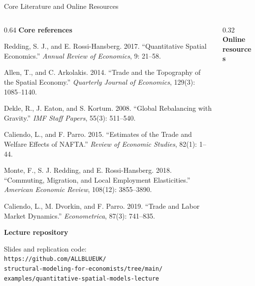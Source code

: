 \documentclass[aspectratio=169,11pt]{beamer}
\begin{document}
\begin{frame}[t]{Core Literature and Online Resources}
  \fontsize{7.4}{8.7}\selectfont
  \begin{columns}[T,onlytextwidth]
    \begin{column}{0.64\textwidth}
      {\color{deepred}\bfseries Core references}

      \vspace{2pt}
      Redding, S. J., and E. Rossi-Hansberg. 2017.
      ``Quantitative Spatial Economics.''
      \emph{Annual Review of Economics}, 9: 21--58.

      \vspace{3pt}
      Allen, T., and C. Arkolakis. 2014.
      ``Trade and the Topography of the Spatial Economy.''
      \emph{Quarterly Journal of Economics}, 129(3): 1085--1140.

      \vspace{3pt}
      Dekle, R., J. Eaton, and S. Kortum. 2008.
      ``Global Rebalancing with Gravity.''
      \emph{IMF Staff Papers}, 55(3): 511--540.

      \vspace{3pt}
      Caliendo, L., and F. Parro. 2015.
      ``Estimates of the Trade and Welfare Effects of NAFTA.''
      \emph{Review of Economic Studies}, 82(1): 1--44.

      \vspace{3pt}
      Monte, F., S. J. Redding, and E. Rossi-Hansberg. 2018.
      ``Commuting, Migration, and Local Employment Elasticities.''
      \emph{American Economic Review}, 108(12): 3855--3890.

      \vspace{3pt}
      Caliendo, L., M. Dvorkin, and F. Parro. 2019.
      ``Trade and Labor Market Dynamics.''
      \emph{Econometrica}, 87(3): 741--835.

      \vspace{8pt}
      {\color{deepred}\bfseries Lecture repository}

      \vspace{2pt}
      Slides and replication code:\\[-1pt]
      \nolinkurl{https://github.com/ALLBLUEUK/}\\[-1pt]
      \nolinkurl{structural-modeling-for-economists/tree/main/}\\[-1pt]
      \nolinkurl{examples/quantitative-spatial-models-lecture}
    \end{column}

    \begin{column}{0.32\textwidth}
      {\color{deepred}\bfseries Online resources}


\end{column}
\end{columns}
\end{frame}
\end{document}
